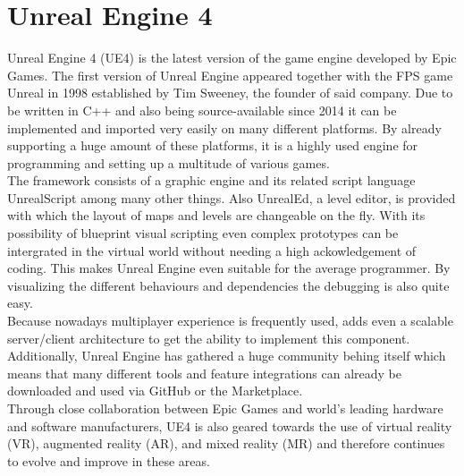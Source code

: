 \documentclass{report}
\begin{document}
	\section[Unreal Engine 4]{Unreal Engine 4 \textsc{\small{\cite{UE4}}}}
	\startsection
		Unreal Engine 4 (UE4) is the latest version of the game engine developed by Epic Games. The first version of Unreal Engine appeared together with the FPS game Unreal in 1998 established by Tim Sweeney, the founder of said company. Due to be written in C++ and also being source-available since 2014 it can be implemented and imported very easily on many different platforms. By already supporting a huge amount of these platforms, it is a highly used engine for programming and setting up a multitude of various games. \\
		The framework consists of a graphic engine and its related script language UnrealScript among many other things. Also UnrealEd, a level editor, is provided with which the layout of maps and levels are changeable on the fly. With its possibility of blueprint visual scripting even complex prototypes can be intergrated in the virtual world without needing a high ackowledgement of coding. This makes Unreal Engine even suitable for the average programmer. By visualizing the different behaviours and dependencies the debugging is also quite easy. \\
		Because nowadays multiplayer experience is frequently used, adds even a scalable server/client architecture to get the ability to implement this component. Additionally, Unreal Engine has gathered a huge community behing itself which means that many different tools and feature integrations can already be downloaded and used via GitHub or the Marketplace. \\
		Through close collaboration between Epic Games and world's leading hardware and software manufacturers, UE4 is also geared towards the use of virtual reality (VR), augmented reality (AR), and mixed reality (MR) and therefore continues to evolve and improve in these areas.
	\closesection
\end{document}
